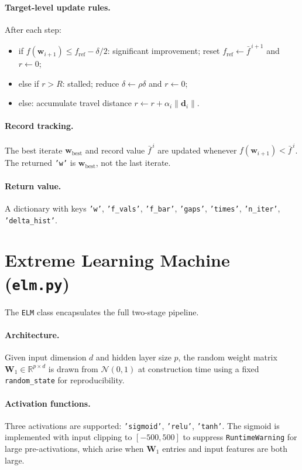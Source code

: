\paragraph{Target-level update rules.}
After each step:
\begin{itemize}[nosep]
    \item if $f(\mathbf{w}_{i+1}) \leq f_{\mathrm{ref}} - \delta/2$: significant
    improvement; reset $f_{\mathrm{ref}} \leftarrow \bar{f}^{\,i+1}$ and $r \leftarrow 0$;
    \item else if $r > R$: stalled; reduce $\delta \leftarrow \rho\delta$ and $r \leftarrow 0$;
    \item else: accumulate travel distance $r \leftarrow r + \alpha_i\|\mathbf{d}_i\|$.
\end{itemize}

\paragraph{Record tracking.}
The best iterate $\mathbf{w}_{\mathrm{best}}$ and record value $\bar{f}^{\,i}$ are
updated whenever $f(\mathbf{w}_{i+1}) < \bar{f}^{\,i}$. The returned \texttt{'w'} is
$\mathbf{w}_{\mathrm{best}}$, not the last iterate.

\paragraph{Return value.}
A dictionary with keys \texttt{'w'}, \texttt{'f\_vals'}, \texttt{'f\_bar'},
\texttt{'gaps'}, \texttt{'times'}, \texttt{'n\_iter'}, \texttt{'delta\_hist'}.

\section{Extreme Learning Machine (\texttt{elm.py})}
\label{sec:impl_elm}

The \texttt{ELM} class encapsulates the full two-stage pipeline.

\paragraph{Architecture.}
Given input dimension $d$ and hidden layer size $p$, the random weight matrix
$\mathbf{W}_1 \in \mathbb{R}^{p \times d}$ is drawn from $\mathcal{N}(0,1)$ at
construction time using a fixed \texttt{random\_state} for reproducibility.

\paragraph{Activation functions.}
Three activations are supported: \texttt{'sigmoid'}, \texttt{'relu'}, \texttt{'tanh'}.
The sigmoid is implemented with input clipping to $[-500, 500]$ to suppress
\texttt{RuntimeWarning} for large pre-activations, which arise when $\mathbf{W}_1$
entries and input features are both large.

